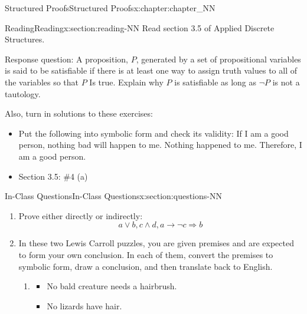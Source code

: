 \documentclass[oneside,10pt,]{book}
\numberwithin{equation}{section}
\begin{document}
\begin{chapterptx}{Structured Proofs}{}{Structured Proofs}{}{}{x:chapter:chapter_NN}
%
%
%
\typeout{************************************************}
\typeout{************************************************}
%
\begin{sectionptx}{Reading}{}{Reading}{}{}{x:section:reading-NN}
Read section 3.5 of Applied Discrete Structures.%
\par
Response question: A proposition, \(P\), generated by a set of propositional variables is said to be satisfiable if there is at least one way to assign truth values to all of the variables so that \(P\) Is true. Explain why \(P\) is satisfiable as long as \(\neg P\)  is not a tautology.%
\par
Also, turn in solutions to these exercises:%
\begin{itemize}[label=\textbullet]
\item{}Put the following into symbolic form and check its validity: If I am a good person, nothing bad will happen to me. Nothing happened to me. Therefore, I am a good person.%
\item{}Section 3.5: \#4 (a)%
\end{itemize}
%
\end{sectionptx}
%
%
\typeout{************************************************}
\typeout{************************************************}
%
\begin{sectionptx}{In-Class Questions}{}{In-Class Questions}{}{}{x:section:questions-NN}
%
\begin{enumerate}[label=\arabic*.]
\item{}Prove either directly or indirectly:%
\begin{equation*}
a \lor  b, c \land  d, a \rightarrow  \neg c \Rightarrow  b
\end{equation*}
%
\item{}In these two Lewis Carroll puzzles, you are given premises and are expected to form your own conclusion.  In each of them, convert the premises to symbolic form, draw a conclusion, and then translate back to English.%
\begin{enumerate}[label=(\alph*)]
\item{}%
\begin{itemize}[label=\textbullet]
\item{}No bald creature needs a hairbrush.%
\item{}No lizards have hair.%
\end{itemize}

\end{enumerate}
\end{enumerate}
\end{sectionptx}
\end{chapterptx}
\end{document}

